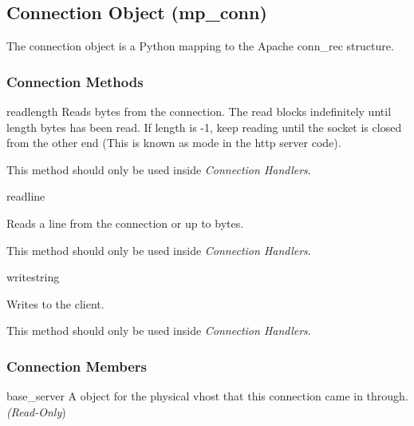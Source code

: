 \subsection{Connection Object (mp_conn)\label{pyapi-mpconn}}

The connection object is a Python mapping to the Apache conn_rec
structure.

\subsubsection{Connection Methods\label{pyapi-mpconn-meth}}

\begin{methoddesc}[connection]{read}{length}
  Reads  bytes from the connection. The read blocks
  indefinitely until length bytes has been read. If length is -1, keep
  reading until the socket is closed from the other end (This is known
  as  mode in the http server code).

  This method should only be used inside \emph{Connection Handlers}.

\end{methoddesc}

\begin{methoddesc}[connection]{readline}{}

  Reads a line from the connection or up to  bytes.

  This method should only be used inside \emph{Connection Handlers}.

\end{methoddesc}

\begin{methoddesc}[connection]{write}{string}

  Writes  to the client.

  This method should only be used inside \emph{Connection Handlers}.

\end{methoddesc}

\subsubsection{Connection Members\label{pyapi-mpconn-mem}}

\begin{memberdesc}[connection]{base_server}
  A  object for the physical vhost that this connection came in
  through.
  \emph{(Read-Only})
\end{memberdesc}

